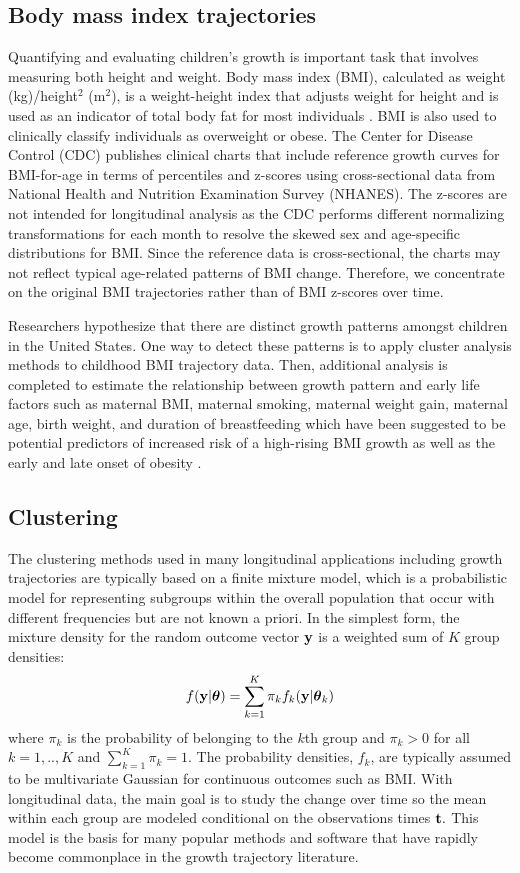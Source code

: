 \subsection{Body mass index trajectories}
Quantifying and evaluating children's growth is important task that involves measuring both height and weight. Body mass index (BMI), calculated as weight (kg)/height$^{2}$ (m$^{2}$), is a weight-height index that adjusts weight for height and is  used as an indicator of total body fat for most individuals \cite{roche1981}. BMI is also used to clinically classify individuals as overweight or obese. The Center for Disease Control (CDC) publishes clinical charts that include reference growth curves for BMI-for-age in terms of percentiles and z-scores using cross-sectional data from National Health and Nutrition Examination Survey (NHANES). The z-scores are not intended for longitudinal analysis as the CDC performs different normalizing transformations for each month to resolve the skewed sex and age-specific distributions for BMI. Since the reference data is cross-sectional, the charts may not reflect typical age-related patterns of BMI change. Therefore, we concentrate on the original BMI trajectories rather than of BMI z-scores over time.

Researchers hypothesize that there are distinct growth patterns amongst children in the United States. One way to detect these patterns is to apply cluster analysis methods to childhood BMI trajectory data. Then, additional analysis is completed to estimate the relationship between growth pattern and early life factors such as maternal BMI, maternal smoking, maternal weight gain, maternal age, birth weight, and duration of breastfeeding which have been suggested to be potential predictors of increased risk of a high-rising BMI growth as well as the early and late onset of obesity \cite{pryor2011,carter2012,li2007}.

\subsection{Clustering}
The clustering methods used in many longitudinal applications including growth trajectories are typically based on a finite mixture model, which is a probabilistic model for representing subgroups within the overall population that occur with different frequencies but are not known a priori. In the simplest form, the mixture density for the random outcome vector $\mathbf y$ is a weighted sum of $K$ group densities:
$$f(\mathbf y|\boldsymbol\theta) = \sum^{K}_{k=1}\pi_{k}f_{k}(\mathbf y|\boldsymbol\theta_{k})$$
where $\pi_{k}$ is the probability of belonging to the $k$th group and $\pi_{k}>0$ for all $k=1,..,K$ and $\sum^{K}_{k=1}\pi_{k}=1$. The probability densities, $f_{k}$, are typically assumed to be multivariate Gaussian for continuous outcomes such as BMI. With longitudinal data, the main goal is to study the change over time so the mean within each group are modeled conditional on the observations times $\mathbf t.$  This model is the basis for many popular methods and software that have rapidly become commonplace in the growth trajectory literature.

